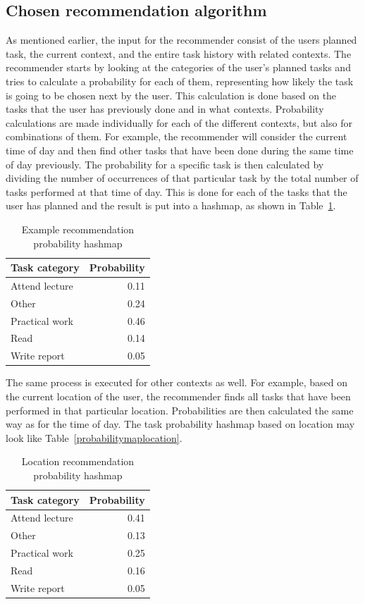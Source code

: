 \subsection{Chosen recommendation algorithm}

As mentioned earlier, the input for the recommender consist of the users planned task, the current context, and the entire task history with related contexts. The recommender starts by looking at the categories of the user's planned tasks and tries to calculate a probability for each of them, representing how likely the task is going to be chosen next by the user. This calculation is done based on the tasks that the user has previously done and in what contexts. Probability calculations are made individually for each of the different contexts, but also for combinations of them. For example, the recommender will consider the current time of day and then find other tasks that have been done during the same time of day previously. The probability for a specific task is then calculated by dividing the number of occurrences of that particular task by the total number of tasks performed at that time of day. This is done for each of the tasks that the user has planned and the result is put into a hashmap, as shown in Table~\ref{tab:probabilitymaptimeofday}.
\begin{table}[tbp]
  \centering
  \begin{tabular}{|l|r|}
	\hline
	\textbf{Task category} & \textbf{Probability} \\
	\hline
	Attend lecture & 0.11 \\
  \hline
	Other & 0.24 \\
	\hline
	Practical work & 0.46 \\
	\hline
	Read & 0.14 \\
	\hline
	Write report & 0.05 \\
	\hline
  \end{tabular}
  \caption{Example recommendation probability hashmap}
  \label{tab:probabilitymaptimeofday}
\end{table}

The same process is executed for other contexts as well. For example, based on the current location of the user, the recommender finds all tasks that have been performed in that particular location. Probabilities are then calculated the same way as for the time of day. The task probability hashmap based on location may look like Table~\ref{probabilitymaplocation}.
\begin{table}[tbp]
  \centering
  \begin{tabular}{|l|r|}
	\hline
	\textbf{Task category} & \textbf{Probability} \\
	\hline
	Attend lecture & 0.41 \\
	\hline
	Other & 0.13 \\
	\hline
	Practical work & 0.25 \\
	\hline
	Read & 0.16 \\
	\hline
	Write report & 0.05 \\
	\hline
  \end{tabular}
  \caption{Location recommendation probability hashmap}
  \label{tab:probabilitymaplocation}
\end{table}


